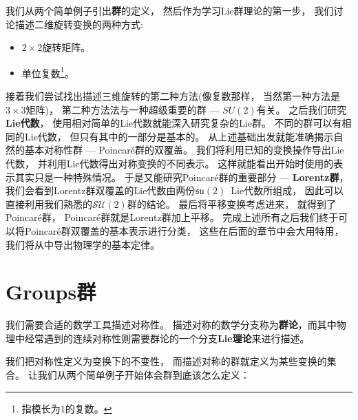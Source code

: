 我们从两个简单例子引出{\bf{群}}的定义， 然后作为学习Lie群理论的第一步， 我们讨论描述二维旋转变换的两种方式:
\begin{itemize}
	\item $2 \times 2$旋转矩阵。
	\item 单位复数\footnote{指模长为$1$的复数。}。
\end{itemize}
接着我们尝试找出描述三维旋转的第二种方法(像复数那样， 当然第一种方法是$3\times3$矩阵)， 第二种方法法与一种超级重要的群 --- {\bf{$SU(2)$}}有关。 之后我们研究{\bf{Lie代数}}， 使用相对简单的Lie代数就能深入研究复杂的Lie群。 不同的群可以有相同的Lie代数， 但只有其中的一部分是基本的。
从上述基础出发就能准确揭示自然的基本对称性群 --- Poincar\'e群的双覆盖。
我们将利用已知的变换操作导出Lie代数， 并利用Lie代数得出对称变换的不同表示。 这样就能看出开始时使用的表示其实只是一种特殊情况。 于是又能研究Poincar\'e群的重要部分 --- {\bf{Lorentz群}}， 我们会看到Lorentz群双覆盖的Lie代数由两份$\mathfrak{su}(2)$\, Lie代数所组成， 因此可以直接利用我们熟悉的$\mathcal{SU}(2)$群的结论。 最后将平移变换考虑进来， 就得到了Poincar\'e群， Poincar\'e群就是Lorentz群加上平移。 完成上述所有之后我们终于可以将Poincar\'e群双覆盖的基本表示进行分类， 这些在后面的章节中会大用特用， 我们将从中导出物理学的基本定律。

\section[群]{Groups\quad 群}
\label{sec3.1}
我们需要合适的数学工具描述对称性。 描述对称的数学分支称为{\bf{群论}}，而其中物理中经常遇到的连续对称性则需要群论的一个分支{\bf{Lie理论}}来进行描述。

我们把对称性定义为变换下的不变性， 而描述对称的群就定义为某些变换的集合。 让我们从两个简单例子开始体会群到底该怎么定义：



